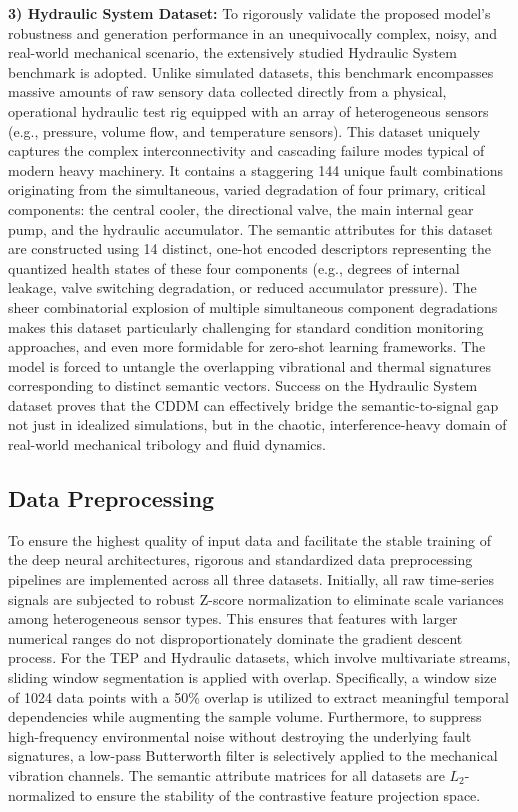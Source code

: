 \textbf{3) Hydraulic System Dataset:} To rigorously validate the proposed model's robustness and generation performance in an unequivocally complex, noisy, and real-world mechanical scenario, the extensively studied Hydraulic System benchmark is adopted. Unlike simulated datasets, this benchmark encompasses massive amounts of raw sensory data collected directly from a physical, operational hydraulic test rig equipped with an array of heterogeneous sensors (e.g., pressure, volume flow, and temperature sensors). This dataset uniquely captures the complex interconnectivity and cascading failure modes typical of modern heavy machinery. It contains a staggering 144 unique fault combinations originating from the simultaneous, varied degradation of four primary, critical components: the central cooler, the directional valve, the main internal gear pump, and the hydraulic accumulator. The semantic attributes for this dataset are constructed using 14 distinct, one-hot encoded descriptors representing the quantized health states of these four components (e.g., degrees of internal leakage, valve switching degradation, or reduced accumulator pressure). The sheer combinatorial explosion of multiple simultaneous component degradations makes this dataset particularly challenging for standard condition monitoring approaches, and even more formidable for zero-shot learning frameworks. The model is forced to untangle the overlapping vibrational and thermal signatures corresponding to distinct semantic vectors. Success on the Hydraulic System dataset proves that the CDDM can effectively bridge the semantic-to-signal gap not just in idealized simulations, but in the chaotic, interference-heavy domain of real-world mechanical tribology and fluid dynamics.

\subsection{Data Preprocessing}
To ensure the highest quality of input data and facilitate the stable training of the deep neural architectures, rigorous and standardized data preprocessing pipelines are implemented across all three datasets. Initially, all raw time-series signals are subjected to robust Z-score normalization to eliminate scale variances among heterogeneous sensor types. This ensures that features with larger numerical ranges do not disproportionately dominate the gradient descent process. For the TEP and Hydraulic datasets, which involve multivariate streams, sliding window segmentation is applied with overlap. Specifically, a window size of 1024 data points with a 50\% overlap is utilized to extract meaningful temporal dependencies while augmenting the sample volume. Furthermore, to suppress high-frequency environmental noise without destroying the underlying fault signatures, a low-pass Butterworth filter is selectively applied to the mechanical vibration channels. The semantic attribute matrices for all datasets are $L_2$-normalized to ensure the stability of the contrastive feature projection space.

